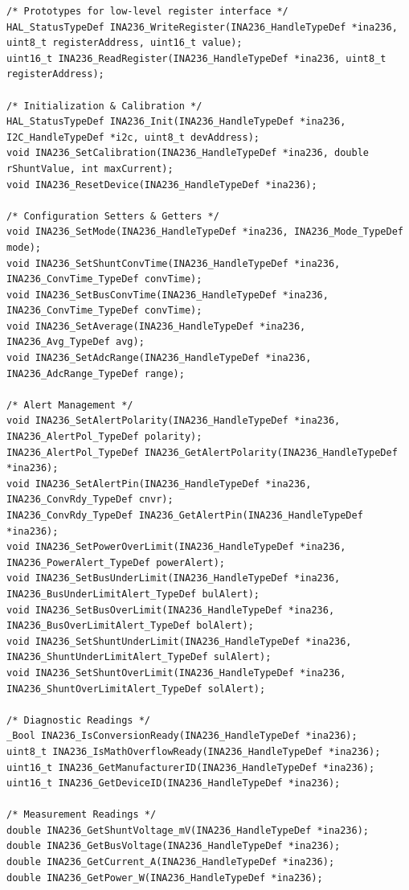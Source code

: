 \documentclass[
10pt, %
a4paper, %
oneside, %
headinclude,footinclude, %
BCOR5mm, %
]{scrartcl}
\begin{document}
\begin{lstlisting}[style=CMakeStyle]
/* Prototypes for low-level register interface */
HAL_StatusTypeDef INA236_WriteRegister(INA236_HandleTypeDef *ina236, uint8_t registerAddress, uint16_t value);
uint16_t INA236_ReadRegister(INA236_HandleTypeDef *ina236, uint8_t registerAddress);

/* Initialization & Calibration */
HAL_StatusTypeDef INA236_Init(INA236_HandleTypeDef *ina236, I2C_HandleTypeDef *i2c, uint8_t devAddress);
void INA236_SetCalibration(INA236_HandleTypeDef *ina236, double rShuntValue, int maxCurrent);
void INA236_ResetDevice(INA236_HandleTypeDef *ina236);

/* Configuration Setters & Getters */
void INA236_SetMode(INA236_HandleTypeDef *ina236, INA236_Mode_TypeDef mode);
void INA236_SetShuntConvTime(INA236_HandleTypeDef *ina236, INA236_ConvTime_TypeDef convTime);
void INA236_SetBusConvTime(INA236_HandleTypeDef *ina236, INA236_ConvTime_TypeDef convTime);
void INA236_SetAverage(INA236_HandleTypeDef *ina236, INA236_Avg_TypeDef avg);
void INA236_SetAdcRange(INA236_HandleTypeDef *ina236, INA236_AdcRange_TypeDef range);

/* Alert Management */
void INA236_SetAlertPolarity(INA236_HandleTypeDef *ina236, INA236_AlertPol_TypeDef polarity);
INA236_AlertPol_TypeDef INA236_GetAlertPolarity(INA236_HandleTypeDef *ina236);
void INA236_SetAlertPin(INA236_HandleTypeDef *ina236, INA236_ConvRdy_TypeDef cnvr);
INA236_ConvRdy_TypeDef INA236_GetAlertPin(INA236_HandleTypeDef *ina236);
void INA236_SetPowerOverLimit(INA236_HandleTypeDef *ina236, INA236_PowerAlert_TypeDef powerAlert);
void INA236_SetBusUnderLimit(INA236_HandleTypeDef *ina236, INA236_BusUnderLimitAlert_TypeDef bulAlert);
void INA236_SetBusOverLimit(INA236_HandleTypeDef *ina236, INA236_BusOverLimitAlert_TypeDef bolAlert);
void INA236_SetShuntUnderLimit(INA236_HandleTypeDef *ina236, INA236_ShuntUnderLimitAlert_TypeDef sulAlert);
void INA236_SetShuntOverLimit(INA236_HandleTypeDef *ina236, INA236_ShuntOverLimitAlert_TypeDef solAlert);

/* Diagnostic Readings */
_Bool INA236_IsConversionReady(INA236_HandleTypeDef *ina236);
uint8_t INA236_IsMathOverflowReady(INA236_HandleTypeDef *ina236);
uint16_t INA236_GetManufacturerID(INA236_HandleTypeDef *ina236);
uint16_t INA236_GetDeviceID(INA236_HandleTypeDef *ina236);

/* Measurement Readings */
double INA236_GetShuntVoltage_mV(INA236_HandleTypeDef *ina236);
double INA236_GetBusVoltage(INA236_HandleTypeDef *ina236);
double INA236_GetCurrent_A(INA236_HandleTypeDef *ina236);
double INA236_GetPower_W(INA236_HandleTypeDef *ina236);
\end{lstlisting}
\end{document}
